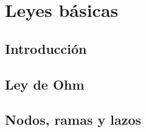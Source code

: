 \chapter{Leyes básicas}
	
		\section{Introducción}
		
		\section{Ley de Ohm}
		
		\section{Nodos, ramas y lazos}